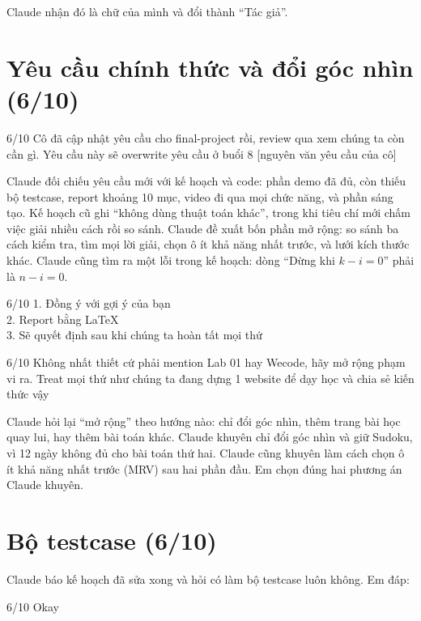 Claude nhận đó là chữ của mình và đổi thành ``Tác giả''.

\section{Yêu cầu chính thức và đổi góc nhìn (6/10)}

\begin{promptbox}{6/10}
Cô đã cập nhật yêu cầu cho final-project rồi, review qua xem chúng ta còn cần gì. Yêu cầu này sẽ overwrite yêu cầu ở buổi 8 [nguyên văn yêu cầu của cô]
\end{promptbox}

Claude đối chiếu yêu cầu mới với kế hoạch và code: phần demo đã đủ, còn thiếu bộ testcase, report khoảng 10 mục, video đi qua mọi chức năng, và phần sáng tạo. Kế hoạch cũ ghi ``không dùng thuật toán khác'', trong khi tiêu chí mới chấm việc giải nhiều cách rồi so sánh. Claude đề xuất bốn phần mở rộng: so sánh ba cách kiểm tra, tìm mọi lời giải, chọn ô ít khả năng nhất trước, và lưới kích thước khác. Claude cũng tìm ra một lỗi trong kế hoạch: dòng ``Dừng khi $k - i = 0$'' phải là $n - i = 0$.

\begin{promptbox}{6/10}
1. Đồng ý với gợi ý của bạn\\
2. Report bằng LaTeX\\
3. Sẽ quyết định sau khi chúng ta hoàn tất mọi thứ
\end{promptbox}

\begin{promptbox}{6/10}
Không nhất thiết cứ phải mention Lab 01 hay Wecode, hãy mở rộng phạm vi ra. Treat mọi thứ như chúng ta đang dựng 1 website để dạy học và chia sẻ kiến thức vậy
\end{promptbox}

Claude hỏi lại ``mở rộng'' theo hướng nào: chỉ đổi góc nhìn, thêm trang bài học quay lui, hay thêm bài toán khác. Claude khuyên chỉ đổi góc nhìn và giữ Sudoku, vì 12 ngày không đủ cho bài toán thứ hai. Claude cũng khuyên làm cách chọn ô ít khả năng nhất trước (MRV) sau hai phần đầu. Em chọn đúng hai phương án Claude khuyên.

\section{Bộ testcase (6/10)}

Claude báo kế hoạch đã sửa xong và hỏi có làm bộ testcase luôn không. Em đáp:

\begin{promptbox}{6/10}
Okay
\end{promptbox}


